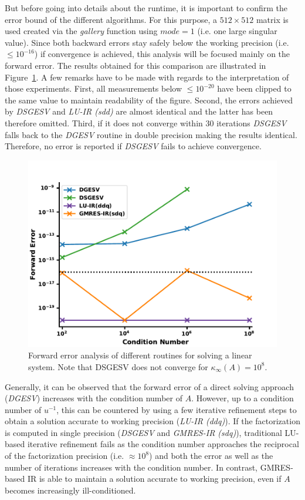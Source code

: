 \noindent But before going into details about the runtime, it is important to confirm the error bound of the different algorithms. For this purpose, a $512 \times 512$ matrix is used created via the \textit{gallery} function using $mode = 1$ (i.e. one large singular value). Since both backward errors stay safely below the working precision (i.e. $\leq 10^{-16}$) if convergence is achieved, this analysis will be focused mainly on the forward error. The results obtained for this comparison are illustrated in Figure~\hyperref[fig:ir3_ac]{\ref{fig:ir3_ac}}. A few remarks have to be made with regards to the interpretation of those experiments. First, all measurements below $\leq 10^{-20}$ have been clipped to the same value to maintain readability of the figure. Second, the errors achieved by \textit{DSGESV} and \textit{LU-IR (sdd)} are almost identical and the latter has been therefore omitted. Third, if it does not converge within 30 iterations \textit{DSGESV} falls back to the \textit{DGESV} routine in double precision making the results identical. Therefore, no error is reported if \textit{DSGESV} fails to achieve convergence.

\begin{figure}[h]
    \centering
    \includegraphics[width=0.7\linewidth]{chapters/5_experiments/figures/IR3_acc.pdf}
    \caption[IR - Forward Error 1]{Forward error analysis of different routines for solving a linear system. Note that DSGESV does not converge for $\kappa_\infty(A)=10^8$.}
    \label{fig:ir3_ac}
\end{figure}

Generally, it can be observed that the forward error of a direct solving approach (\textit{DGESV}) increases with the condition number of $A$. However, up to a condition number of $u^{-1}$, this can be countered by using a few iterative refinement steps to obtain a solution accurate to working precision (\textit{LU-IR (ddq)}). If the factorization is computed in single precision (\textit{DSGESV} and \textit{GMRES-IR (sdq)}), traditional LU-based iterative refinement fails as the condition number approaches the reciprocal of the factorization precision (i.e. $\approx 10^8$) and both the error as well as the number of iterations increases with the condition number. In contrast, GMRES-based IR is able to maintain a solution accurate to working precision, even if $A$ becomes increasingly ill-conditioned.

